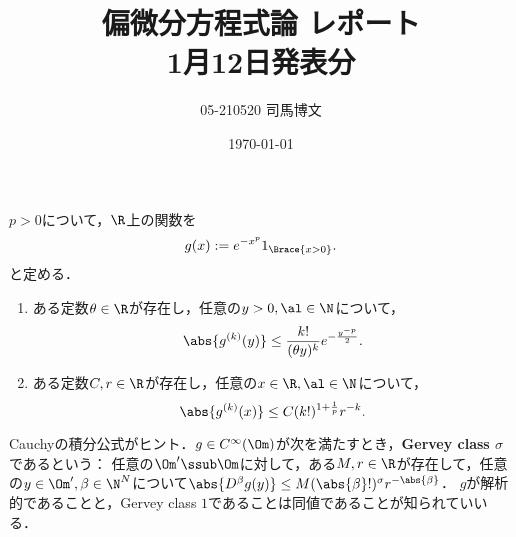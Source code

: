 \documentclass[uplatex,dvipdfmx]{jsarticle}
\title{偏微分方程式論 レポート\\1月12日発表分}\author{05-210520 司馬博文}\date{\today}
\begin{document}
\setcounter{section}{1}
\maketitle

\begin{problem}
    $p>0$について，$\R$上の関数を
    \[g(x):=e^{-x^p}1_{\Brace{x>0}}.\]
    と定める．
    \begin{enumerate}
        \item ある定数$\theta\in\R$が存在し，任意の$y>0,\al\in\N$について，
        \[\abs{g^{(k)}(y)}\le\frac{k!}{(\theta y)^k}e^{-\frac{y^{-p}}{2}}.\]
        \item ある定数$C,r\in\R$が存在し，任意の$x\in\R,\al\in\N$について，
        \[\abs{g^{(k)}(x)}\le C(k!)^{1+\frac{1}{p}}r^{-k}.\]
    \end{enumerate}
\end{problem}
\begin{remark}
    Cauchyの積分公式がヒント．$g\in C^\infty(\Om)$が次を満たすとき，\textbf{Gervey class $\sigma$}であるという：
    任意の$\Om'\ssub\Om$に対して，ある$M,r\in\R$が存在して，任意の$y\in\Om',\beta\in\N^N$について$\abs{D^\beta g(y)}\le M(\abs{\beta}!)^\sigma r^{-\abs{\beta}}$．
    $g$が解析的であることと，Gervey class $1$であることは同値であることが知られていいる．
\end{remark}
\end{document}
